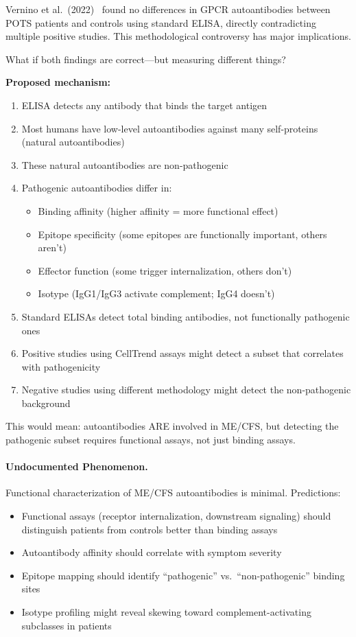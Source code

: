 \begin{open_question}
Vernino et al.\ (2022)~\cite{POTS2022failed_replication} found no differences in GPCR autoantibodies between POTS patients and controls using standard ELISA, directly contradicting multiple positive studies. This methodological controversy has major implications.

What if both findings are correct---but measuring different things?

\textbf{Proposed mechanism:}
\begin{enumerate}
    \item ELISA detects any antibody that binds the target antigen
    \item Most humans have low-level autoantibodies against many self-proteins (natural autoantibodies)
    \item These natural autoantibodies are non-pathogenic
    \item Pathogenic autoantibodies differ in:
    \begin{itemize}
        \item Binding affinity (higher affinity = more functional effect)
        \item Epitope specificity (some epitopes are functionally important, others aren't)
        \item Effector function (some trigger internalization, others don't)
        \item Isotype (IgG1/IgG3 activate complement; IgG4 doesn't)
    \end{itemize}
    \item Standard ELISAs detect total binding antibodies, not functionally pathogenic ones
    \item Positive studies using CellTrend assays might detect a subset that correlates with pathogenicity
    \item Negative studies using different methodology might detect the non-pathogenic background
\end{enumerate}

This would mean: autoantibodies ARE involved in ME/CFS, but detecting the pathogenic subset requires functional assays, not just binding assays.
\end{open_question}

\paragraph{Undocumented Phenomenon.} Functional characterization of ME/CFS autoantibodies is minimal. Predictions:
\begin{itemize}
    \item Functional assays (receptor internalization, downstream signaling) should distinguish patients from controls better than binding assays
    \item Autoantibody affinity should correlate with symptom severity
    \item Epitope mapping should identify ``pathogenic'' vs.\ ``non-pathogenic'' binding sites
    \item Isotype profiling might reveal skewing toward complement-activating subclasses in patients
\end{itemize}

